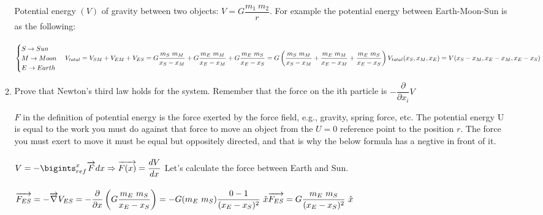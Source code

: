 \documentclass[fleqn]{article}
\begin{document}
\begin{enumerate}
\begin{enumerate}
      \textcolor{hwColor}{
        Potential energy $(V)$ of gravity between two objects: $V=G\dfrac{m_1 ~ m_2}{r}$. For example 
        the potential energy between Earth-Moon-Sun is as the following: \\
        \\
        $
          \begin{cases}
            S \rightarrow Sun \\
            M \rightarrow Moon \\
            E \rightarrow Earth \\
          \end{cases} \\
          \\
          V_{total}=V_{SM}+V_{EM}+V_{ES} \\
          \\
          =G\dfrac{m_S ~ m_M}{x_S-x_M}+G\dfrac{m_E ~ m_M}{x_E-x_M}+G\dfrac{m_E ~ m_S}{x_E-x_S}=G\left(\dfrac{m_S ~ m_M}{x_S-x_M}+\dfrac{m_E ~ m_M}{x_E-x_M}+\dfrac{m_E ~ m_S}{x_E-x_S}\right) \\
          \\
          V_{total}(x_S, x_M, x_E)=V(x_S-x_M, x_E-x_M, x_E-x_S)
        $
      }

      \item Prove that Newton’s third law holds for the system. Remember
      that the force on the ith particle is $-\dfrac{\partial }{\partial x_i}V$

      \textcolor{hwColor}{
        $F$ in the definition of potential energy is the force exerted by the force field, e.g., gravity, spring force, etc. 
        The potential energy U is equal to the work you must do against that force to move an object from the $U=0$ reference point to the position $r$.
        The force you must exert to move it must be equal but oppositely directed, and that is why the below formula has a negtive in front of it. \\
        \\
        $
          V=-\bigints_{ref}^{x} \overrightarrow{F} dx \Rightarrow \overrightarrow{F(x)}=\dfrac{dV}{dx} \\ \\
        $
        Let's calculate the force between Earth and Sun. \\
        \\
        $
          \overrightarrow{F_{ES}}=-\overrightarrow{\nabla}V_{ES}=-\dfrac{\partial}{\partial x}\left(G\dfrac{m_E ~ m_S}{x_E-x_S}\right)=-G(m_E ~ m_S)\dfrac{0-1}{(x_E-x_S)^2} ~ \hat{x} \\
          \\
          \overrightarrow{F_{ES}}=G\dfrac{m_E ~ m_S}{(x_E-x_S)^2} ~ \hat{x} \\
        $
      }


\end{enumerate}
\end{enumerate}
\end{document}

